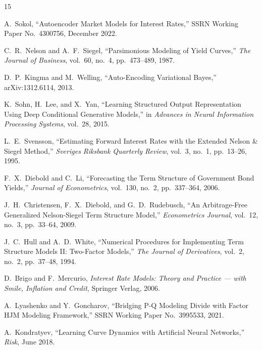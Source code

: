 \documentclass[10pt,a4paper]{article}
\theoremstyle{plain}
\theoremstyle{definition}
\begin{document}
\vspace{7mm}

\begin{thebibliography}{15}

 A.~Sokol, ``Autoencoder Market Models for Interest Rates,'' SSRN Working Paper No.~4300756, December 2022.

 C.~R.~Nelson and A.~F.~Siegel, ``Parsimonious Modeling of Yield Curves,'' \textit{The Journal of Business}, vol.~60, no.~4, pp.~473--489, 1987.

 D.~P.~Kingma and M.~Welling, ``Auto-Encoding Variational Bayes,'' arXiv:1312.6114, 2013.

 K.~Sohn, H.~Lee, and X.~Yan, ``Learning Structured Output Representation Using Deep Conditional Generative Models,'' in \textit{Advances in Neural Information Processing Systems}, vol.~28, 2015.

 L.~E.~Svensson, ``Estimating Forward Interest Rates with the Extended Nelson \& Siegel Method,'' \textit{Sveriges Riksbank Quarterly Review}, vol.~3, no.~1, pp.~13--26, 1995.

 F.~X.~Diebold and C.~Li, ``Forecasting the Term Structure of Government Bond Yields,'' \textit{Journal of Econometrics}, vol.~130, no.~2, pp.~337--364, 2006.

 J.~H.~Christensen, F.~X.~Diebold, and G.~D.~Rudebusch, ``An Arbitrage-Free Generalized Nelson-Siegel Term Structure Model,'' \textit{Econometrics Journal}, vol.~12, no.~3, pp.~33--64, 2009.

 J.~C.~Hull and A.~D.~White, ``Numerical Procedures for Implementing Term Structure Models II: Two-Factor Models,'' \textit{The Journal of Derivatives}, vol.~2, no.~2, pp.~37--48, 1994.

 D.~Brigo and F.~Mercurio, \textit{Interest Rate Models: Theory and Practice --- with Smile, Inflation and Credit}, Springer Verlag, 2006.

 A.~Lyashenko and Y.~Goncharov, ``Bridging P-Q Modeling Divide with Factor HJM Modeling Framework,'' SSRN Working Paper No.~3995533, 2021.

 A.~Kondratyev, ``Learning Curve Dynamics with Artificial Neural Networks,'' \textit{Risk}, June 2018.


\end{thebibliography}
\end{document}
